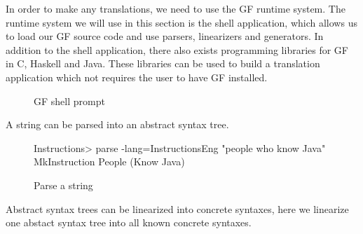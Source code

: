 In order to make any translations, we need to use the GF runtime system. The  runtime system we will use in this section is the shell application, which allows us to load our GF source code and use parsers, linearizers and generators. In addition to the shell application, there also exists programming libraries for GF in C, Haskell and Java. These libraries can be used to build a translation application which not requires the user to have GF installed.

\begin{figure}[H]

\caption{GF shell prompt\label{fig:gf-shell}}
\end{figure}

A string can be parsed into an abstract syntax tree.

\begin{figure}[H]
\begin{terminal}
Instructions> parse -lang=InstructionsEng "people who know Java"
MkInstruction People (Know Java)
\end{terminal}

\caption{Parse a string\label{fig:parse-a-string}}
\end{figure}

Abstract syntax trees can be linearized into concrete syntaxes, here we linearize one abstact syntax tree into all known concrete syntaxes.

